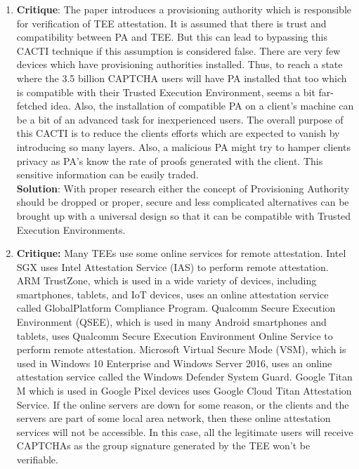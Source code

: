 \begin{enumerate}
	\item \textbf{Critique}: The paper introduces a provisioning authority which is responsible for verification of TEE attestation. It is assumed that there is trust and compatibility between PA and TEE. But this can lead to bypassing this CACTI technique if this assumption is considered false. There are very few devices which have provisioning authorities installed. Thus, to reach a state where the 3.5 billion CAPTCHA users will have PA installed that too which is compatible with their Trusted Execution Environment, seems a bit far-fetched idea. Also, the installation of compatible PA on a client's machine can be a bit of an advanced task for inexperienced users. The overall purpose of this CACTI is to reduce the clients efforts which are expected to vanish by introducing so many layers. Also, a malicious PA might try to hamper clients privacy as PA’s know the rate of proofs generated with the client. This sensitive information can be easily traded.\\

	\textbf{Solution}: With proper research either the concept of Provisioning Authority should be dropped or proper, secure and less complicated alternatives can be brought up with a universal design so that it can be compatible with Trusted Execution Environments.\\

	\item \textbf{Critique:} Many TEEs use some online services for remote attestation. Intel SGX uses Intel Attestation Service (IAS) to perform remote attestation. ARM TrustZone, which is used in a wide variety of devices, including smartphones, tablets, and IoT devices, uses an online attestation service called GlobalPlatform Compliance Program. Qualcomm Secure Execution Environment (QSEE), which is used in many Android smartphones and tablets, uses Qualcomm Secure Execution Environment Online Service to perform remote attestation. Microsoft Virtual Secure Mode (VSM), which is used in Windows 10 Enterprise and Windows Server 2016, uses an online attestation service called the Windows Defender System Guard. Google Titan M which is used in Google Pixel devices uses Google Cloud Titan Attestation Service.
	If the online servers are down for some reason, or the clients and the servers are part of some local area network, then these online attestation services will not be accessible. In this case, all the legitimate users will receive CAPTCHAs as the group signature generated by the TEE won’t be verifiable. \\


\end{enumerate}
